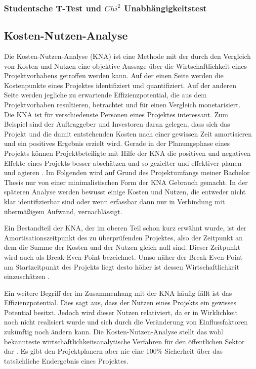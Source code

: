 \subsubsection{Studentsche T-Test und $Chi^2$ Unabhängigkeitstest}

\subsection{Kosten-Nutzen-Analyse}
Die Kosten-Nutzen-Analyse (KNA) ist eine Methode mit der durch den Vergleich von Kosten und Nutzen eine objektive Aussage über die Wirtschaftlichkeit eines Projektvorhabens getroffen werden kann. Auf der einen Seite werden die Kostenpunkte eines Projektes identifiziert und quantifiziert. Auf der anderen Seite werden jegliche zu erwartende Effizienzpotential, die aus dem Projektvorhaben resultieren, betrachtet und für einen Vergleich monetarisiert. Die KNA ist für verschiedenste Personen eines Projektes interessant. Zum Beispiel sind der Auftraggeber und Investoren daran gelegen, dass sich das Projekt und die damit entstehenden Kosten nach einer gewissen Zeit amortisieren und ein positives Ergebnis erzielt wird. Gerade in der Planungsphase eines Projekts können Projektbeteiligte mit Hilfe der KNA die positiven und negativen Effekte eines Projekts besser abschätzen und so gezielter und effektiver planen und agieren \citep{Hanusch2011}. Im Folgenden wird auf Grund des Projektumfangs meiner Bachelor Thesis nur von einer minimalistischen Form der KNA Gebrauch gemacht. In der späteren Analyse werden bewusst einige Kosten und Nutzen, die entweder nicht klar identifizierbar sind oder wenn erfassbar dann nur in Verbindung mit übermäßigem Aufwand, vernachlässigt. 

Ein Bestandteil der KNA, der im oberen Teil schon kurz erwähnt wurde, ist der Amortisationszeitpunkt des zu überprüfenden Projektes, also der Zeitpunkt an dem die Summe der Kosten und der Nutzen gleich null sind. Dieser Zeitpunkt wird auch als Break-Even-Point bezeichnet. Umso näher der Break-Even-Point am Startzeitpunkt des Projekts liegt desto höher ist dessen Wirtschaftlichkeit einzuschätzen \citep{Hanusch2011}.

Ein weitere Begriff der im Zusammenhang mit der KNA häufig fällt ist das Effizienzpotential. Dies sagt aus, dass der Nutzen eines Projekts ein gewisses Potential besitzt. Jedoch wird dieser Nutzen relativiert, da er in Wirklichkeit noch nicht realisiert wurde und sich durch die Veränderung von Einflussfaktoren zukünftig noch ändern kann. Die Kosten-Nutzen-Analyse \glqq [...] stellt das wohl bekannteste wirtschaftlichkeitsanalytische Verfahren für den öffentlichen Sektor dar\grqq{} \citep[1]{Hanusch2011}. Es gibt den Projektplanern aber nie eine 100\% Sicherheit über das tatsächliche Endergebnis eines Projektes.

